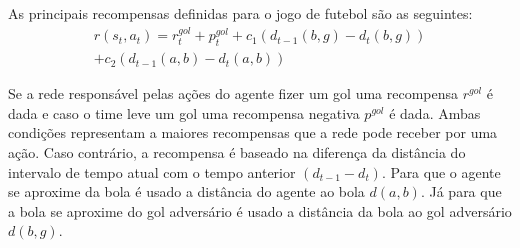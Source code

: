 As principais recompensas definidas para o jogo de futebol são as seguintes:
\begin{multline}
r (s_t, a_t) = r^{gol}_t + p^{gol}_t + c_1(d_{t-1}(b,g) - d_{t}(b,g))\\  + c_2(d_{t-1}(a,b) - d_{t}(a,b))
\end{multline}

Se a rede responsável pelas ações do agente fizer um gol uma recompensa $r^{gol}$ é dada e caso o time leve um gol uma recompensa negativa $p^{gol}$ é dada. Ambas condições representam a maiores recompensas que a rede pode receber por uma ação. 
Caso contrário, a recompensa é baseado na diferença da distância do intervalo de tempo atual com o tempo anterior $(d_{t-1}-d_t)$. Para que o agente se aproxime da bola é usado a distância do agente ao bola $d(a,b)$. Já para que a bola se aproxime do gol adversário é usado a distância da bola ao gol adversário $d(b,g)$.
